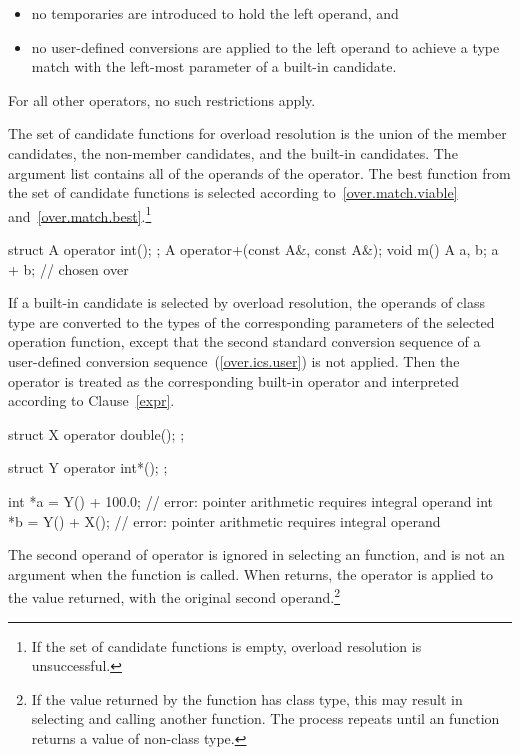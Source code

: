 \begin{itemize}
\item
no temporaries are introduced to hold the left operand, and
\item
no user-defined conversions are applied to the left operand to achieve
a type match with the left-most parameter of a built-in candidate.
\end{itemize}

\pnum
For all other operators, no such restrictions apply.

\pnum
The set of candidate functions for overload resolution is the
union of the member candidates, the non-member candidates, and
the built-in candidates.
The argument list contains all of the
operands of the operator.
The best function from the set of candidate functions is selected
according to~\ref{over.match.viable}
and~\ref{over.match.best}.\footnote{If the set of candidate functions is empty,
overload resolution is unsuccessful.}
\begin{example}

\begin{codeblock}
struct A {
  operator int();
};
A operator+(const A&, const A&);
void m() {
  A a, b;
  a + b;                        //  chosen over 
}
\end{codeblock}
\end{example}

\pnum
If a built-in candidate is selected by overload resolution, the
operands of class type are converted to the types of the corresponding parameters
of the selected operation function, except that the second standard conversion
sequence of a user-defined conversion sequence~(\ref{over.ics.user}) is not applied.
Then the operator is treated as the corresponding
built-in operator and interpreted according to Clause~\ref{expr}.
\begin{example}
\begin{codeblock}
struct X {
  operator double();
};

struct Y {
  operator int*();
};

int *a = Y() + 100.0;           // error: pointer arithmetic requires integral operand
int *b = Y() + X();             // error: pointer arithmetic requires integral operand
\end{codeblock}
\end{example}

\pnum
The second operand of operator
\tcode{->}
is ignored in selecting an
function, and is not an argument when the
function is called.
When
returns, the operator
\tcode{->}
is applied to the value returned, with the original second
operand.\footnote{If the value returned by the
function has class type, this may result in selecting and calling another
function.
The process repeats until an
function returns a value of non-class type.}

